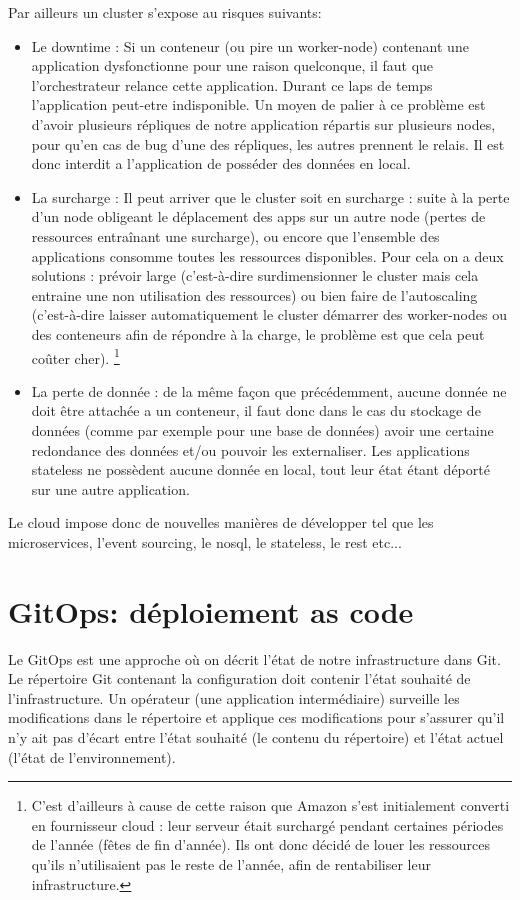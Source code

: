 \documentclass[11pt,fleqn]{book} %
\begin{document}
Par ailleurs un cluster s'expose au risques suivants: 
\begin{itemize}
    \item Le downtime : Si un conteneur (ou pire un worker-node) contenant une application dysfonctionne pour une raison quelconque, il faut que l'orchestrateur relance cette application. Durant ce laps de temps l'application peut-etre indisponible. Un moyen de palier à ce problème est d'avoir plusieurs répliques de notre application répartis sur plusieurs nodes, pour qu'en cas de bug d'une des répliques, les autres prennent le relais. Il est donc interdit a l'application de posséder des données en local. 
    \item La surcharge : Il peut arriver que le cluster soit en surcharge : suite à la perte d'un node obligeant le déplacement des apps sur un autre node (pertes de ressources entraînant une surcharge), ou encore que l'ensemble des  applications consomme toutes les ressources disponibles. Pour cela on a deux solutions : prévoir large (c'est-à-dire surdimensionner le cluster mais cela entraine une non utilisation des ressources) ou bien faire de l'autoscaling (c'est-à-dire laisser automatiquement le cluster démarrer des worker-nodes ou des conteneurs afin de répondre à la charge, le problème est que cela peut coûter cher). \footnote{C'est d'ailleurs à cause de cette raison que Amazon s'est initialement converti en fournisseur cloud : leur serveur était surchargé pendant certaines périodes de l'année (fêtes de fin d'année). Ils ont donc décidé de louer les ressources qu'ils n'utilisaient pas le reste de l'année, afin de rentabiliser leur infrastructure.}
    \item La perte de donnée : de la même façon que précédemment, aucune donnée ne doit être attachée a un conteneur, il faut donc dans le cas du stockage de données (comme par exemple pour une base de données) avoir une certaine redondance des données et/ou pouvoir les externaliser. Les applications stateless ne possèdent aucune donnée en local, tout leur état étant déporté sur une autre application.
\end{itemize}

Le cloud impose donc de nouvelles manières de développer tel que les microservices, l'event sourcing, le nosql, le stateless, le rest etc...

\section{GitOps: déploiement as code}
Le GitOps est une approche où on décrit l’état de notre infrastructure dans Git. Le répertoire Git contenant la configuration doit contenir l’état souhaité de l’infrastructure. Un opérateur (une application intermédiaire) surveille les modifications dans le répertoire et applique ces modifications pour s’assurer qu’il n’y ait pas d’écart entre l’état souhaité (le contenu du répertoire) et l’état actuel (l’état de l’environnement). 
\end{document}
